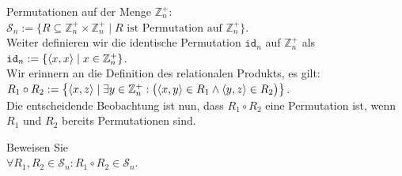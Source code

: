 Permutationen auf der Menge $\mathbb{Z}_n^+$:
\\[0.2cm]
\hspace*{1.3cm}
$\mathcal{S}_n := \{ R \subseteq \mathbb{Z}_n^+ \times \mathbb{Z}_n^+ \mid \mbox{$R$ ist Permutation auf $\mathbb{Z}_n^+$} \}$.
\\[0.2cm]
Weiter definieren wir die identische Permutation $\mathtt{id}_n$ auf $\mathbb{Z}_n^+$ als
\\[0.2cm]
\hspace*{1.3cm}
$\mathtt{id}_n := \{ \pair(x,x) \mid x \in \mathbb{Z}_n^+ \}$.
\\[0.2cm]
Wir erinnern an die Definition des relationalen Produkts, es gilt:
\\[0.2cm]
\hspace*{1.3cm}
$R_1 \circ R_2 := \bigl\{ \pair(x,z) \mid \exists y \in \mathbb{Z}_n^+:\bigl( \pair(x,y) \in R_1 \wedge \pair(y,z) \in R_2\bigr) \bigl\}$.
\\[0.2cm]
Die entscheidende Beobachtung ist nun, dass $R_1 \circ R_2$ eine Permutation ist, wenn $R_1$ und $R_2$
bereits Permutationen sind.

\exercise
Beweisen Sie
\\[0.2cm]
\hspace*{1.3cm}
$\forall R_1, R_2 \in \mathcal{S}_n: R_1 \circ R_2 \in \mathcal{S}_n$.
\exend


